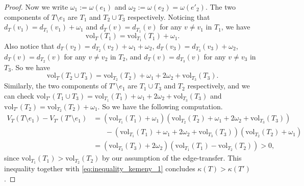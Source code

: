 \documentclass[10pt,a4paper]{amsart}
\newcommand{\vol}{\text{vol}}
\begin{document}
\begin{proof}
Now we write $\omega_1:=\omega(e_1)$ and $\omega_2:=\omega(e_2)=\omega(e'_2)$. The two components of $T\setminus e_1$ are $T_1$ and $T_2\cup T_3$ respectively. Noticing that $d_T(v_1)=d_{T_1}(v_1)+\omega_1$ and $d_T(v)=d_{T_1}(v)$ for any $v\neq v_1$ in $T_1$, we have
   \[\vol_{T}(T_1)=\vol_{T_1}(T_1)+\omega_1.\]
Also notice that $d_{T}(v_2)=d_{T_2}(v_2)+\omega_1+\omega_2$, $d_{T}(v_3)=d_{T_3}(v_3)+\omega_2$, $d_T(v)=d_{T_2}(v)$ for any $v\neq v_2$ in $T_2$, and $d_T(v)=d_{T_3}(v)$ for any $v\neq v_3$ in $T_3$. So we have
    \[\vol_{T}(T_2\cup T_3)=\vol_{T_2}(T_2)+\omega_1+2\omega_2+\vol_{T_3}(T_3).\]
Similarly, the two components of $T'\setminus e_1$ are $T_1\cup T_3$ and $T_2$ respectively, and we can check $\vol_{T'}(T_1\cup T_3)=\vol_{T_1}(T_1)+\omega_1+2\omega_2+\vol_{T_3}(T_3)$ and $\vol_{T'}(T_2)=\vol_{T_2}(T_2)+\omega_1$. So we have the following computation.
\begin{align*}
    V_T(T\setminus e_1)-V_{T'}(T'\setminus e_1)&=(\vol_{T_1}(T_1)+\omega_1)(\vol_{T_2}(T_2)+\omega_1+2\omega_2+\vol_{T_3}(T_3))\\
    &\hspace{20pt}-(\vol_{T_1}(T_1)+\omega_1+2\omega_2+\vol_{T_3}(T_3))(\vol_{T_2}(T_2)+\omega_1)\\
    &=(\vol_{T_3}(T_3)+2\omega_2)(\vol_{T_1}(T_1)-\vol_{T_2}(T_2))>0,
\end{align*}since $\vol_{T_1}(T_1)>\vol_{T_2}(T_2)$ by our assumption of the edge-transfer. This inequality together with \eqref{eq:inequality_kemeny_1} concludes $\kappa(T)>\kappa(T')$.
\end{proof}
\end{document}
